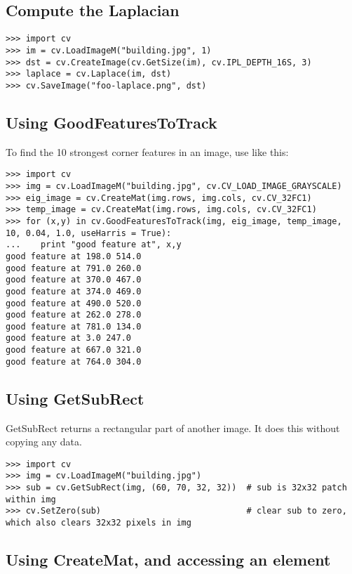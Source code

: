 \subsection{Compute the Laplacian}

\begin{lstlisting}
>>> import cv
>>> im = cv.LoadImageM("building.jpg", 1)
>>> dst = cv.CreateImage(cv.GetSize(im), cv.IPL_DEPTH_16S, 3)
>>> laplace = cv.Laplace(im, dst)
>>> cv.SaveImage("foo-laplace.png", dst)
\end{lstlisting}


\subsection{Using GoodFeaturesToTrack}

To find the 10 strongest corner features in an image, use  like this:

\begin{lstlisting}
>>> import cv
>>> img = cv.LoadImageM("building.jpg", cv.CV_LOAD_IMAGE_GRAYSCALE)
>>> eig_image = cv.CreateMat(img.rows, img.cols, cv.CV_32FC1)
>>> temp_image = cv.CreateMat(img.rows, img.cols, cv.CV_32FC1)
>>> for (x,y) in cv.GoodFeaturesToTrack(img, eig_image, temp_image, 10, 0.04, 1.0, useHarris = True):
...    print "good feature at", x,y
good feature at 198.0 514.0
good feature at 791.0 260.0
good feature at 370.0 467.0
good feature at 374.0 469.0
good feature at 490.0 520.0
good feature at 262.0 278.0
good feature at 781.0 134.0
good feature at 3.0 247.0
good feature at 667.0 321.0
good feature at 764.0 304.0
\end{lstlisting}


\subsection{Using GetSubRect}

GetSubRect returns a rectangular part of another image.  It does this without copying any data.

\begin{lstlisting}
>>> import cv
>>> img = cv.LoadImageM("building.jpg")
>>> sub = cv.GetSubRect(img, (60, 70, 32, 32))  # sub is 32x32 patch within img
>>> cv.SetZero(sub)                             # clear sub to zero, which also clears 32x32 pixels in img
\end{lstlisting}

\subsection{Using CreateMat, and accessing an element}

